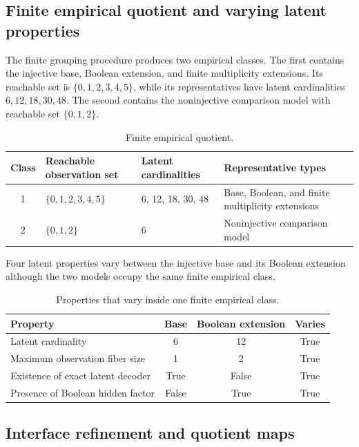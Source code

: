 \subsection{Finite empirical quotient and varying latent properties}

The finite grouping procedure produces two empirical classes. The first contains the injective base, Boolean extension, and finite multiplicity extensions. Its reachable set is \(\{0,1,2,3,4,5\}\), while its representatives have latent cardinalities \(6,12,18,30,48\). The second contains the noninjective comparison model with reachable set \(\{0,1,2\}\).

\begin{table}[tbp]
\centering
\caption{Finite empirical quotient.}
\label{tab:empiricalclasses}
\small
\begin{tabularx}{\textwidth}{@{}cXlX@{}}
\toprule
Class & Reachable observation set & Latent cardinalities & Representative types \\
\midrule
1 & \(\{0,1,2,3,4,5\}\) & 6, 12, 18, 30, 48 & Base, Boolean, and finite multiplicity extensions \\
2 & \(\{0,1,2\}\) & 6 & Noninjective comparison model \\
\bottomrule
\end{tabularx}
\end{table}

Four latent properties vary between the injective base and its Boolean extension although the two models occupy the same finite empirical class.

\begin{table}[tbp]
\centering
\caption{Properties that vary inside one finite empirical class.}
\label{tab:nonidentifiable}
\small
\begin{tabularx}{\textwidth}{@{}Xccc@{}}
\toprule
Property & Base & Boolean extension & Varies \\
\midrule
Latent cardinality & 6 & 12 & True \\
Maximum observation fiber size & 1 & 2 & True \\
Existence of exact latent decoder & True & False & True \\
Presence of Boolean hidden factor & False & True & True \\
\bottomrule
\end{tabularx}
\end{table}



\subsection{Interface refinement and quotient maps}

